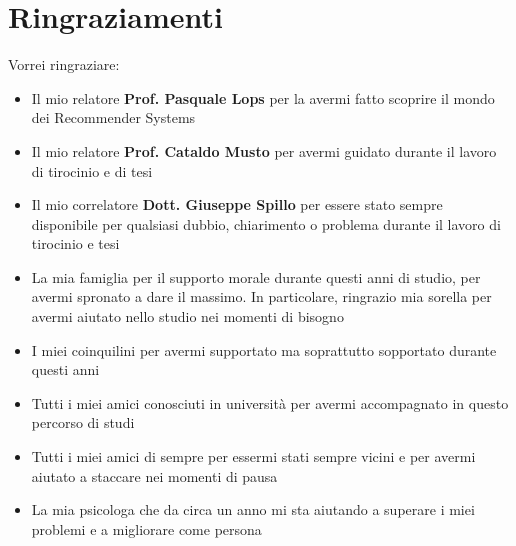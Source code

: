 \section*{Ringraziamenti}

Vorrei ringraziare:
\begin{itemize}
    \item Il mio relatore \textbf{Prof. Pasquale Lops} per la avermi fatto scoprire il mondo dei Recommender Systems
    \item Il mio relatore \textbf{Prof. Cataldo Musto} per avermi guidato durante il lavoro di tirocinio e di tesi
    \item Il mio correlatore \textbf{Dott. Giuseppe Spillo} per essere stato sempre disponibile per qualsiasi dubbio, chiarimento o problema durante il lavoro di tirocinio e tesi
    \item La mia famiglia per il supporto morale durante questi anni di studio, per avermi spronato a dare il massimo. In particolare, ringrazio mia sorella per avermi aiutato nello studio nei momenti di bisogno
    \item I miei coinquilini per avermi supportato ma soprattutto sopportato durante questi anni
    \item Tutti i miei amici conosciuti in università per avermi accompagnato in questo percorso di studi
    \item Tutti i miei amici di sempre per essermi stati sempre vicini e per avermi aiutato a staccare nei momenti di pausa
    \item La mia psicologa che da circa un anno mi sta aiutando a superare i miei problemi e a migliorare come persona
\end{itemize}